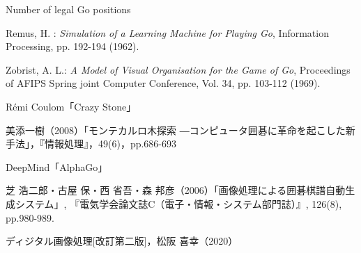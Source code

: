 \documentclass[openright]{nitocs}
\numberwithin{equation}{section}
\begin{document}
    \begin{thebibliography}{10} %


        Number of legal Go positions

        Remus, H. : 
        {\it Simulation of a Learning Machine for Playing Go}, 
        Information Processing, 
        pp. 192-194 (1962). 

        Zobrist, A. L.: 
        {\it A Model of Visual Organisation for the Game of Go}, 
        Proceedings of AFIPS Spring joint Computer Conference, 
        Vol. 34, pp. 103-112 (1969). 

        Rémi Coulom「Crazy Stone」

        美添一樹（2008）「モンテカルロ木探索 ―コンピュータ囲碁に革命を起こした新手法」，『情報処理』，49(6)，pp.686-693

        DeepMind「AlphaGo」

        芝 浩二郎・古屋 保・西 省吾・森 邦彦（2006）「画像処理による囲碁棋譜自動生成システム」,  『電気学会論文誌C（電子・情報・システム部門誌）』, 126(8), pp.980-989.

        ディジタル画像処理[改訂第二版]，松阪 喜幸（2020）








    \end{thebibliography}
\end{document}
